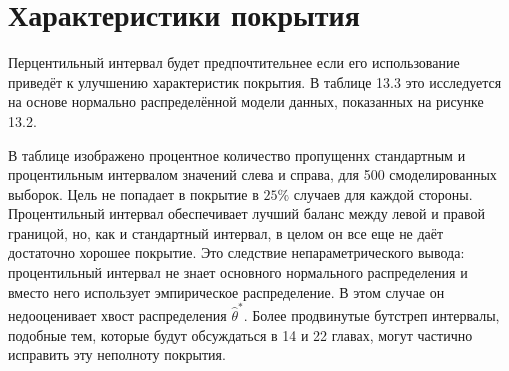 \section{Характеристики покрытия}
Перцентильный интервал будет предпочтительнее если его использование приведёт к улучшению характеристик покрытия. В таблице 13.3 это исследуется на основе нормально распределённой модели данных, показанных на рисунке 13.2.

\begin{figure}[H]
\end{figure}

В таблице изображено процентное количество пропущеннх стандартным и процентильным интервалом значений слева и справа, для 500 смоделированных выборок. Цель не попадает в покрытие в $25 \%$ случаев для каждой стороны. Процентильный интервал обеспечивает лучший баланс между левой и правой границой, но, как и стандартный интервал, в целом он все еще не даёт достаточно хорошее покрытие. Это следствие непараметрического вывода: процентильный
интервал не знает основного нормального распределения и вместо него использует эмпирическое распределение. В этом случае он недооценивает хвост распределения $\hat{\theta}^{*}$. Более продвинутые бутстреп интервалы, подобные тем, которые будут обсуждаться в 14 и 22 главах, могут частично исправить эту неполноту покрытия.
